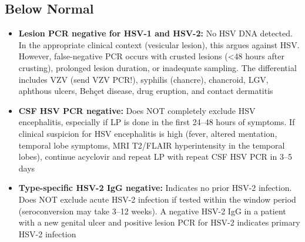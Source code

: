 \subsection*{Below Normal}
\begin{itemize}
  \item \textbf{Lesion PCR negative for HSV-1 and HSV-2:} No HSV DNA detected. In the appropriate clinical context (vesicular lesion), this argues against HSV. However, false-negative PCR occurs with crusted lesions (<48 hours after crusting), prolonged lesion duration, or inadequate sampling. The differential includes VZV (send VZV PCR!), syphilis (chancre), chancroid, LGV, aphthous ulcers, Behçet disease, drug eruption, and contact dermatitis
  \item \textbf{CSF HSV PCR negative:} Does NOT completely exclude HSV encephalitis, especially if LP is done in the first 24--48 hours of symptoms. If clinical suspicion for HSV encephalitis is high (fever, altered mentation, temporal lobe symptoms, MRI T2/FLAIR hyperintensity in the temporal lobes), continue acyclovir and repeat LP with repeat CSF HSV PCR in 3--5 days
  \item \textbf{Type-specific HSV-2 IgG negative:} Indicates no prior HSV-2 infection. Does NOT exclude acute HSV-2 infection if tested within the window period (seroconversion may take 3--12 weeks). A negative HSV-2 IgG in a patient with a new genital ulcer and positive lesion PCR for HSV-2 indicates primary HSV-2 infection
\end{itemize}

